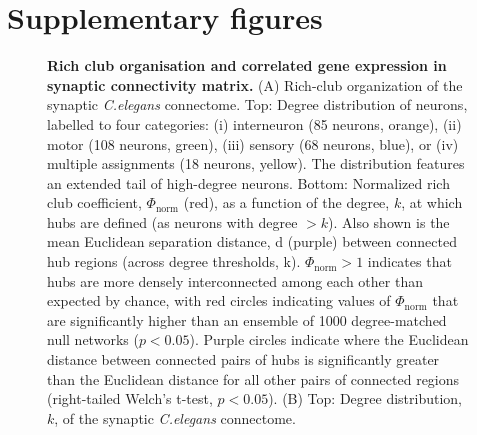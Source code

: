 \newpage
\section{Supplementary figures}
\label{app:AppendixCh2_4}

\begin{figure}[h!]
 \caption{{\bf Rich club organisation and correlated gene expression in synaptic connectivity matrix.}
(A) Rich-club organization of the synaptic \textit{C.elegans} connectome.
Top: Degree distribution of neurons, labelled to four categories: (i) interneuron (85 neurons, orange), (ii) motor (108 neurons, green), (iii) sensory (68 neurons, blue), or (iv) multiple assignments (18 neurons, yellow).
The distribution features an extended tail of high-degree neurons. Bottom: Normalized rich club coefficient, $\Phi_\mathrm{norm}$ (red), as a function of the degree, $k$, at which hubs are defined (as neurons with degree $>k$).
Also shown is the mean Euclidean separation distance, d (purple) between connected hub regions (across degree thresholds, k). $\Phi_\mathrm{norm} > 1$ indicates that hubs are more densely interconnected among each other than expected by chance, with red circles indicating values of $\Phi_\mathrm{norm}$ that are significantly higher than an ensemble of 1000 degree-matched null networks ($p < 0.05$).
Purple circles indicate where the Euclidean distance between connected pairs of hubs is significantly greater than the Euclidean distance for all other pairs of connected regions (right-tailed Welch's t-test, $p < 0.05$).
(B) Top: Degree distribution, $k$, of the synaptic \textit{C.elegans}  connectome.
}
\end{figure}
